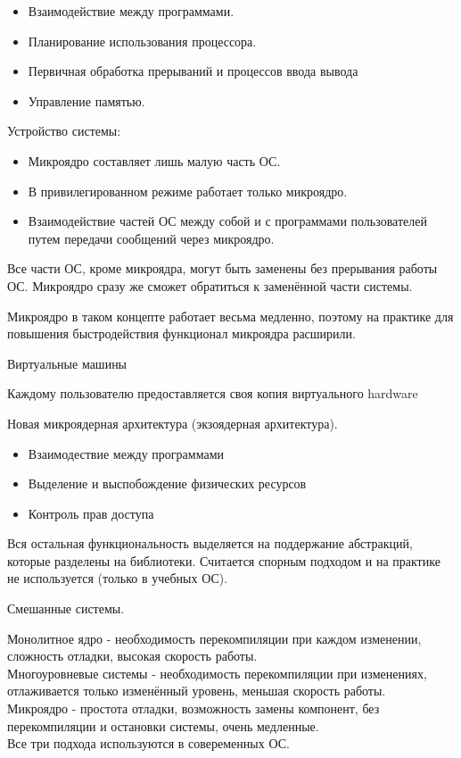 \documentclass[12pt, a4paper]{article}
\begin{document}
    \begin{itemize}
        \item Взаимодействие между программами.
        \item Планирование использования процессора.
        \item Первичная обработка прерываний и процессов ввода вывода
        \item Управление памятью.
    \end{itemize}
    Устройство системы:
    \begin{itemize}
        \item Микроядро составляет лишь малую часть ОС.
        \item В привилегированном режиме работает только микроядро.
        \item Взаимодействие частей ОС между собой и с программами пользователей путем передачи сообщений через микроядро.
    \end{itemize}
     Все части ОС, кроме микроядра, могут быть заменены без прерывания работы ОС. Микроядро сразу же сможет обратиться 
    к заменённой части системы.\par
     Микроядро в таком концепте работает весьма медленно, поэтому на практике для повышения быстродействия функционал микроядра расширили.
    \begin{center}
        Виртуальные машины
    \end{center}
    Каждому пользователю предоставляется своя копия виртуального hardware
    \begin{center}
        Новая микроядерная архитектура (экзоядерная архитектура).
    \end{center}
    \begin{itemize}
        \item Взаимодествие между программами 
        \item Выделение и выспобождение физических ресурсов 
        \item Контроль прав доступа
    \end{itemize} 
     Вся остальная функциональность выделяется на поддержание абстракций, которые разделены на библиотеки. 
    Считается спорным подходом и на практике не используется (только в учебных ОС).
    \begin{center}
        Смешанные системы.
    \end{center} 
    Монолитное ядро - необходимость перекомпиляции при каждом изменении, сложность отладки, высокая скорость работы.\\
    Многоуровневые системы - необходимость перекомпиляции при изменениях, отлаживается только изменённый уровень, меньшая скорость работы.\\
    Микроядро - простота отладки, возможность замены компонент, без перекомпиляции и остановки системы, очень медленные.\\
    Все три подхода используются в совеременных ОС.
\end{document}

